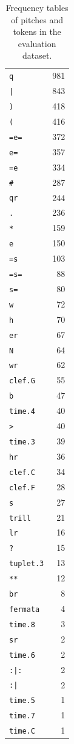 \begin{table}[p]
\begin{tabular}{lr}
        \midrule
        \verb`q` & 981 \\
        \verb`|` & 843 \\
        \verb`)` & 418 \\
        \verb`(` & 416 \\
        \verb`=e=` & 372 \\
        \verb`e=` & 357 \\
        \verb`=e` & 334 \\
        \verb`#` & 287 \\
        \verb`qr` & 244 \\
        \verb`.` & 236 \\
        \verb`*` & 159 \\
        \verb`e` & 150 \\
        \verb`=s` & 103 \\
        \verb`=s=` & 88 \\
        \verb`s=` & 80 \\
        \verb`w` & 72 \\
        \verb`h` & 70 \\
        \verb`er` & 67 \\
        \verb`N` & 64 \\
        \verb`wr` & 62 \\
        \verb`clef.G` & 55 \\
        \verb`b` & 47 \\
        \verb`time.4` & 40 \\
        \verb`>` & 40 \\
        \verb`time.3` & 39 \\
        \verb`hr` & 36 \\
        \verb`clef.C` & 34 \\
        \verb`clef.F` & 28 \\
        \verb`s` & 27 \\
        \verb`trill` & 21 \\
        \verb`lr` & 16 \\
        \verb`?` & 15 \\
        \verb`tuplet.3` & 13 \\
        \verb`**` & 12 \\
        \verb`br` & 8 \\
        \verb`fermata` & 4 \\
        \verb`time.8` & 3 \\
        \verb`sr` & 2 \\
        \verb`time.6` & 2 \\
        \verb`:|:` & 2 \\
        \verb`:|` & 2 \\
        \verb`time.5` & 1 \\
        \verb`time.7` & 1 \\
        \verb`time.C` & 1 \\
        \bottomrule
    \end{tabular}
    \caption{Frequency tables of pitches and tokens in the evaluation dataset.}
    \label{tab6:TokenFrequencies}
\end{table}


